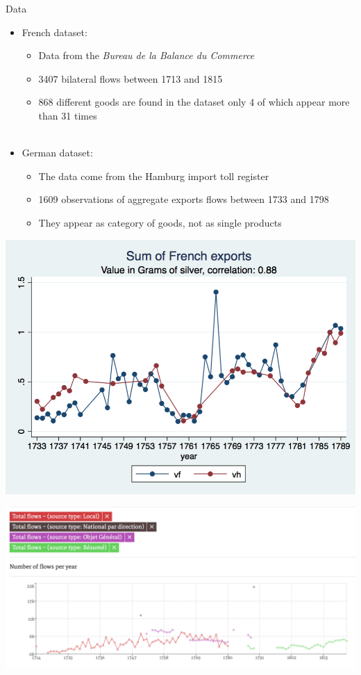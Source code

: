 \documentclass[11pt]{beamer}
\begin{document}
\begin{frame}{Data}
\begin{itemize}
\item{French dataset:}
\begin{itemize}
\item{Data from the \textit{Bureau de la Balance du Commerce}}
\item{3407 bilateral flows between 1713 and 1815}
\item{868 different goods are found in the dataset only 4 of which appear more than 31 times}\\~\\
\end{itemize}
\item{German dataset:}
\begin{itemize}
\item{The data come from the Hamburg import toll register}
\item{1609 observations of aggregate exports flows between 1733 and 1798}
\item{They appear as category of goods, not as single products}
\end{itemize}
\end{itemize}
\end{frame}

\begin{frame}
\begin{center}
\includegraphics[scale=.3]{long_evolution.png}
\end{center}

\end{frame}


\begin{frame}
\includegraphics[scale=.3]{source1}
\end{frame}
\end{document}
